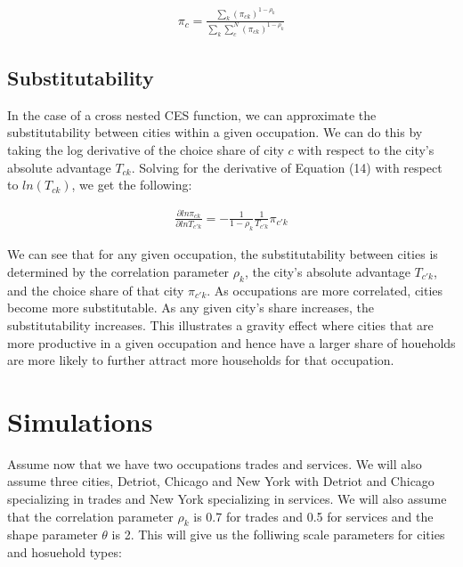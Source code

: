 \documentclass[10pt]{article}
\begin{document}
\begin{align}
    \pi_c = \frac{\sum_{k}^{} (\pi_{ck})^{1 - \rho_k}}{\sum_{k}^{} \sum_{c}^{N} (\pi_{ck})^{1 - \rho_k}}
\end{align}

\subsection{Substitutability}

In the case of a cross nested CES function, we can approximate the substitutability between cities within a given occupation. We can do this by taking the log derivative of the choice share of city $c$ with respect to the city's absolute advantage $T_{ck}$. Solving for the derivative of Equation (14) with respect to $ln (T_{ck})$, we get the following:

\begin{align}
    \frac{\partial ln \pi_{ck}}{\partial ln T_{c'k}} = - \frac{1}{1 - \rho_k} \frac{1}{T_{c'k}} \pi_{c'k}
\end{align}

We can see that for any given occupation, the substitutability between cities is determined by the correlation parameter $\rho_k$, the city's absolute advantage $T_{c'k}$, and the choice share of that city $\pi_{c'k}$. As occupations are more correlated, cities become more substitutable. As any given city's share increases, the substitutability increases. This illustrates a gravity effect where cities that are more productive in a given occupation and hence have a larger share of houeholds are more likely to further attract more households for that occupation.

\section{Simulations}

Assume now that we have two occupations trades and services. We will also assume three cities, Detriot, Chicago and New York with Detriot and Chicago specializing in trades and New York specializing in services. We will also assume that the correlation parameter $\rho_k$ is 0.7 for trades and 0.5 for services and the shape parameter $\theta$ is 2. This will give us the folliwing scale parameters for cities and hosuehold types:

\vspace{2em}
\end{document}
